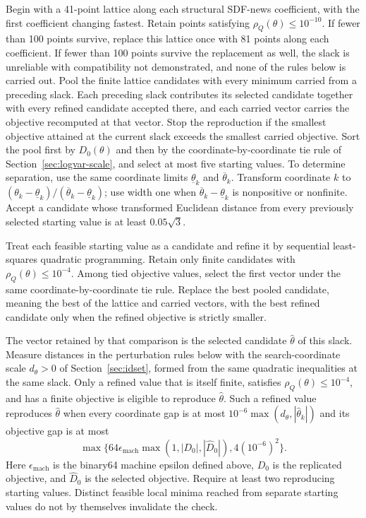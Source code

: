\documentclass[11pt]{article}
\begin{document}
Begin with a 41-point lattice along each structural SDF-news coefficient, with the first coefficient
changing fastest. Retain points satisfying \(\rho_Q(\theta)\le10^{-10}\). If fewer than 100
points survive, replace this lattice once with 81 points along each coefficient. If fewer than 100
points survive the replacement as well, the slack is unreliable with compatibility not demonstrated,
and none of the rules below is carried out. Pool the finite
lattice candidates with every minimum carried from a preceding slack. Each preceding slack contributes
its selected candidate together with every refined candidate accepted there, and each carried vector
carries the objective recomputed at that vector. Stop the reproduction if the smallest objective
attained at the current slack exceeds the smallest carried objective. Sort the pool first by \(D_0(\theta)\)
and then by the coordinate-by-coordinate tie rule of Section~\ref{sec:logvar-scale}, and select at
most five starting values. To determine
separation, use the same coordinate limits \(\underline\theta_k\) and \(\overline\theta_k\). Transform coordinate \(k\) to
\((\theta_k-\underline\theta_k)/(\overline\theta_k-\underline\theta_k)\); use width one when
\(\overline\theta_k-\underline\theta_k\) is nonpositive or nonfinite.
Accept a candidate whose transformed Euclidean distance from every previously selected starting value is at
least \(0.05\sqrt3\).

Treat each feasible starting value as a candidate and refine it by sequential least-squares
quadratic programming. Retain only finite candidates with \(\rho_Q(\theta)\le10^{-4}\). Among tied
objective values, select the first vector under the same coordinate-by-coordinate tie rule. Replace
the best pooled candidate, meaning the best of the lattice and carried vectors, with the best
refined candidate only when the refined objective is strictly smaller.

The vector retained by that comparison is the selected candidate \(\widehat\theta\) of this slack.
Measure distances in the perturbation rules below with the search-coordinate scale \(d_\theta>0\) of
Section~\ref{sec:idset}, formed from the same quadratic inequalities at the same slack. Only a refined
value that is itself finite, satisfies \(\rho_Q(\theta)\le10^{-4}\), and has a finite objective is
eligible to reproduce \(\widehat\theta\). Such a refined value reproduces \(\widehat\theta\) when every coordinate gap
is at most \(10^{-6}\max(d_\theta,|\widehat\theta_k|)\) and its objective gap is at most
\begin{equation*}
 \max\{64\epsilon_{\mathrm{mach}}\max(1,|D_0|,|\widehat D_0|),
       4(10^{-6})^2\}.
\end{equation*}
Here \(\epsilon_{\mathrm{mach}}\) is the binary64 machine epsilon defined above, \(D_0\) is the replicated
objective, and \(\widehat D_0\) is the selected objective. Require at least two reproducing starting values.
Distinct feasible local minima reached from separate starting values do not by themselves invalidate the check.
\end{document}

